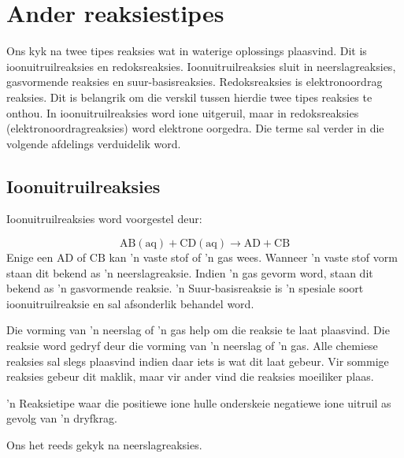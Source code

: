\section{Ander reaksiestipes}
    \nopagebreak

Ons kyk na twee tipes reaksies wat in waterige oplossings plaasvind. Dit is ioonuitruilreaksies en redoksreaksies. Ioonuitruilreaksies sluit in neerslagreaksies, gasvormende reaksies en suur-basisreaksies. Redoksreaksies is elektronoordrag reaksies. Dit is belangrik om die verskil tussen hierdie twee tipes reaksies te onthou. In ioonuitruilreaksies word ione uitgeruil, maar in redoksreaksies (elektronoordragreaksies) word elektrone oorgedra. Die terme sal verder in die volgende afdelings verduidelik word. 
      \par 
\subsection*{Ioonuitruilreaksies}
      \label{m38719*uid78332}
Ioonuitruilreaksies word voorgestel deur:
	  \label{m38719*eid071534}\nopagebreak\noindent{}
	    
    \begin{equation*}
    \text{AB}\left(\text{aq}\right)+\text{CD}\left(\text{aq}\right)\to \text{AD}+\text{CB}
      \end{equation*}
	  Enige een $\text{AD}$ of $\text{CB}$ kan 'n vaste stof of 'n gas wees. Wanneer 'n vaste stof vorm staan dit bekend as 'n neerslagreaksie.  Indien 'n gas gevorm word, staan dit bekend as  'n gasvormende reaksie.  'n Suur-basisreaksie is 'n spesiale soort ioonuitruilreaksie en sal afsonderlik behandel word.
      \par 
      \label{m38719*eip-179}Die vorming van 'n neerslag of  'n gas help om die reaksie te laat plaasvind.  Die reaksie word gedryf deur die vorming van 'n neerslag of 'n gas.  Alle chemiese reaksies sal slegs plaasvind indien daar iets is wat dit laat gebeur. Vir sommige reaksies gebeur dit maklik, maar vir ander vind die reaksies moeiliker plaas.  \par 
\label{m38719*id7583}
  { 'n Reaksietipe waar die positiewe ione hulle onderskeie negatiewe ione uitruil as gevolg van 'n dryfkrag.} 
\label{m38719*uid10825}
	\par
Ons het reeds gekyk na neerslagreaksies.
